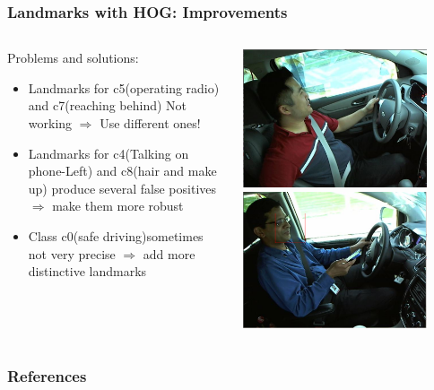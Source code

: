 \documentclass{beamer}
\begin{document}
	\begin{frame}
		\frametitle{Landmarks with HOG: Improvements}		
		\begin{columns}
			\begin{column}{0.5\textwidth}
				Problems and solutions:
				\begin{itemize}
					\item Landmarks for c5(operating radio) and c7(reaching behind) Not working $\Rightarrow$ Use different ones!
					\item Landmarks for c4(Talking on phone-Left) and c8(hair and make up) produce several false positives $\Rightarrow$ make them more robust
					\item Class c0(safe driving)sometimes not very precise $\Rightarrow$ add more distinctive landmarks
				\end{itemize}
			\end{column}
			\begin{column}{0.5\textwidth}
				\begin{center}
					\includegraphics[width=0.85\textwidth]{mult_HOG/ReachingBehind}\\
					\includegraphics[width=0.85\textwidth]{mult_HOG/talk_phone_left}
				\end{center}
			\end{column}
		\end{columns}
		
	\end{frame}

    
	\begin{frame}[allowframebreaks]
		\frametitle{References} 
		\nocite{*} 
		 
		 
	\end{frame}

	\medskip
\end{document}
